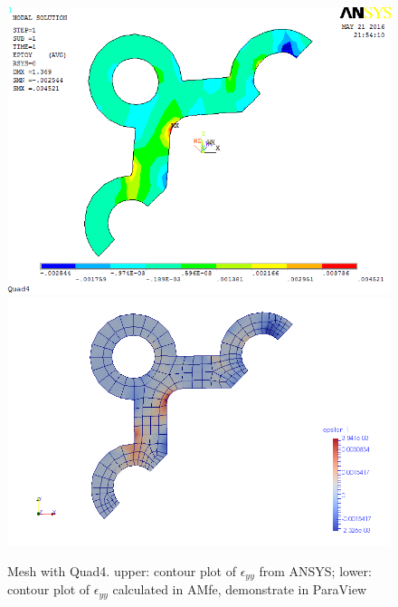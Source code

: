 \begin{figure}[htbp]
	\begin{center}
		\includegraphics[width=13cm,clip]{Quad4_Eyy.png} 		
		\includegraphics[width=13cm,clip]{Quad4_Eyy_P.png} 		
		\caption{Mesh with Quad4. upper: contour plot of $\epsilon_{yy}$ from ANSYS; lower: contour plot of $\epsilon_{yy}$ calculated in AMfe, demonstrate in ParaView} \label{fig: Quad4_Eyy}
	\end{center}
\end{figure}

